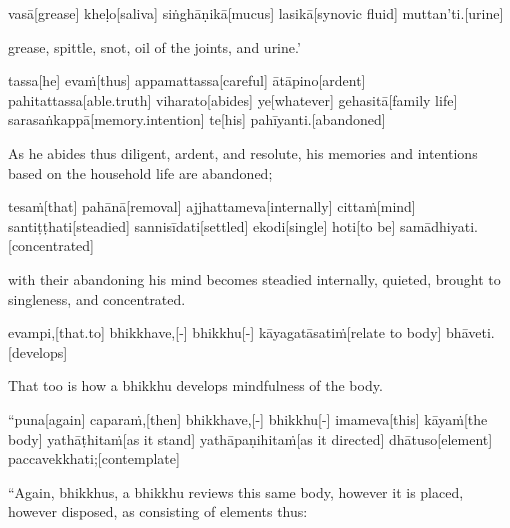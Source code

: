 \begin{samepage}
\begingl[glneveryline={\PaliGlossA,\PaliGlossB}]
vasā[grease] kheḷo[saliva] siṅghāṇikā[mucus] lasikā[synovic fluid] muttan’ti.[urine]
\endgl
\nopagebreak
\linespread{0.5}
\begin{spacin}{0.2}
{\PaliGlossFT grease, spittle, snot, oil of the joints, and urine.’}
\end{spacin}
\vskip 12pt
\end{samepage}
\begin{samepage}
\begingl[glneveryline={\PaliGlossA,\PaliGlossB}]
tassa[he] evaṁ[thus] appamattassa[careful] ātāpino[ardent] pahitattassa[able.truth] viharato[abides] ye[whatever] gehasitā[family life] sarasaṅkappā[memory.intention] te[his] pahīyanti.[abandoned]
\endgl
\nopagebreak
\linespread{0.5}
\begin{spacin}{0.2}
{\PaliGlossFT As he abides thus diligent, ardent, and resolute, his memories and intentions based on the household life are abandoned;}
\end{spacin}
\vskip 12pt
\end{samepage}
\begin{samepage}
\begingl[glneveryline={\PaliGlossA,\PaliGlossB}]
tesaṁ[that] pahānā[removal] ajjhattameva[internally] cittaṁ[mind] santiṭṭhati[steadied] sannisīdati[settled] ekodi[single] hoti[to be] samādhiyati.[concentrated]
\endgl
\nopagebreak
\linespread{0.5}
\begin{spacin}{0.2}
{\PaliGlossFT with their abandoning his mind becomes steadied internally, quieted, brought to singleness, and concentrated.}
\end{spacin}
\vskip 12pt
\end{samepage}
\begin{samepage}
\begingl[glneveryline={\PaliGlossA,\PaliGlossB}]
evampi,[that.to] bhikkhave,[-] bhikkhu[-] kāyagatāsatiṁ[relate to body] bhāveti.[develops]
\endgl
\nopagebreak
\linespread{0.5}
\begin{spacin}{0.2}
{\PaliGlossFT That too is how a bhikkhu develops mindfulness of the body.}
\end{spacin}
\vskip 12pt
\end{samepage}
\vskip 0.05in
\begin{samepage}
\begingl[glneveryline={\PaliGlossA,\PaliGlossB}]
“puna[again] caparaṁ,[then] bhikkhave,[-] bhikkhu[-] imameva[this] kāyaṁ[the body] yathāṭhitaṁ[as it stand] yathāpaṇihitaṁ[as it directed] dhātuso[element] paccavekkhati;[contemplate]
\endgl
\nopagebreak
\linespread{0.5}
\begin{spacin}{0.2}
{\PaliGlossFT “Again, bhikkhus, a bhikkhu reviews this same body, however it is placed, however disposed, as consisting of elements thus:}
\end{spacin}
\vskip 12pt
\end{samepage}
